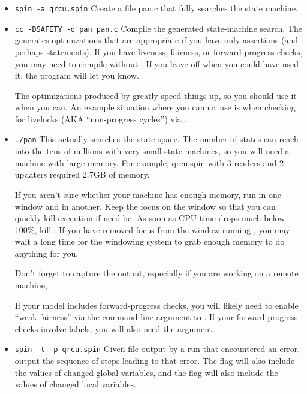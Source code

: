 \begin{itemize}
\item	{\tt spin -a qrcu.spin}
	Create a file pan.c that fully searches the state machine.
\item	{\tt cc -DSAFETY -o pan pan.c}
	Compile the generated state-machine search.  The 
	generates optimizations that are appropriate if you have only
	assertions (and perhaps  statements).  If you have
	liveness, fairness, or forward-progress checks, you may need
	to compile without .  If you leave off 
	when you could have used it, the program will let you know.

	The optimizations produced by  greatly speed things
	up, so you should use it when you can.
	An example situation where you cannot use  is
	when checking for livelocks (AKA ``non-progress cycles'')
	via .
\item	{\tt ./pan}
	This actually searches the state space.  The number of states
	can reach into the tens of millions with very small state
	machines, so you will need a machine with large memory.
	For example, qrcu.spin with 3 readers and 2 updaters required
	2.7GB of memory.

	If you aren't sure whether your machine has enough memory,
	run  in one window and  in another.  Keep the
	focus on the  window so that you can quickly kill
	execution if need be.  As soon as CPU time drops much below
	100\%, kill .  If you have removed focus from the
	window running , you may wait a long time for the
	windowing system to grab enough memory to do anything for
	you.

	Don't forget to capture the output, especially
	if you are working on a remote machine,

	If your model includes forward-progress checks, you will likely
	need to enable ``weak fairness'' via the  command-line
	argument to .
	If your forward-progress checks involve  labels,
	you will also need the  argument.
\item	{\tt spin -t -p qrcu.spin}
	Given  file output by a run that encountered an
	error, output the sequence of steps leading to that error.
	The  flag will also include the values of changed
	global variables, and the   flag will also include
	the values of changed local variables.
\end{itemize}

